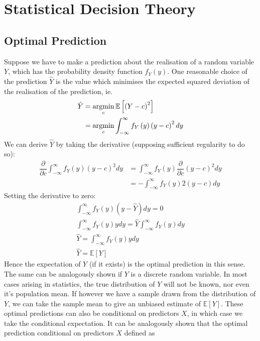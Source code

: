 \documentclass[11pt]{report} %
\begin{document}
\section{Statistical Decision Theory}

\subsection{Optimal Prediction}

Suppose we have to make a prediction about the realisation of a random variable $Y$, which has the probability density function $f_{Y}\left(y\right)$. One reasonable choice of the prediction $\hat{Y}$ is the value which minimises the expected squared deviation of the realisation of the prediction, ie.
\begin{align}
\hat{Y} &= \operatorname*{argmin}_{c}\mathbb{E}\left[\left(Y - c\right)^{2}\right] \\
&= \operatorname*{argmin}_{c}\int_{-\infty}^{\infty}f_{Y}\left(y\right)\left(y - c\right)^{2}dy
\end{align}
We can derive $\hat{Y}$ by taking the derivative (supposing sufficient regularity to do so):
\begin{align}
\dfrac{\partial}{\partial c}\int_{-\infty}^{\infty}f_{Y}\left(y\right)\left(y - c\right)^{2}dy &= \int_{-\infty}^{\infty}f_{Y}\left(y\right)\dfrac{\partial}{\partial c}\left(y - c\right)^{2}dy \\
&= -\int_{-\infty}^{\infty}f_{Y}\left(y\right)2\left(y - c\right)dy
\end{align}
Setting the derivative to zero:
\begin{gather}
\int_{-\infty}^{\infty}f_{Y}\left(y\right)\left(y - \hat{Y}\right)dy = 0 \\
\int_{-\infty}^{\infty}f_{Y}\left(y\right)ydy = \hat{Y}\int_{-\infty}^{\infty}f_{Y}\left(y\right)dy \\
\hat{Y} = \int_{-\infty}^{\infty}f_{Y}\left(y\right)ydy \\
\hat{Y} = \mathbb{E}\left[Y\right]
\end{gather}
Hence the expectation of $Y$ (if it exists) is the optimal prediction in this sense. The same can be analogously shown if $Y$ is a discrete random variable. In most cases arising in statistics, the true distribution of $Y$ will not be known, nor even it's population mean. If however we have a sample drawn from the distribution of $Y$, we can take the sample mean to give an unbiased estimate of $\mathbb{E}\left[Y\right]$. These optimal predictions can also be conditional on predictors $X$, in which case we take the conditional expectation. It can be analogously shown that the optimal prediction conditional on predictors $X$ defined as
\end{document}
